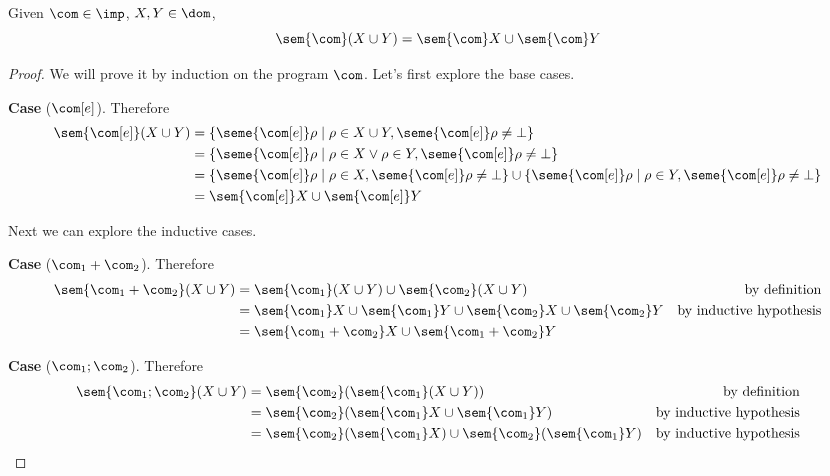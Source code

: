 \begin{observation}[Additivity]
  Given \(\com\in\imp\), \(X,Y \in \dom\),
  \[\sem{\com}(X\cup Y) = \sem{\com}X \cup \sem{\com}Y\]
\end{observation}

\begin{proof}
  We will prove it by induction on the program \(\com\). Let's first
  explore the base cases.

  \medskip

  \noindent
  \textbf{Case} (\(\com[e]\)). Therefore
  \begin{align*}
    \sem{\com[e]}(X\cup Y) & = \{\seme{\com[e]}\rho \mid \rho \in X \cup Y, \seme{\com[e]}\rho \neq \bot\} \\
                           & = \{\seme{\com[e]}\rho \mid \rho \in X \vee \rho \in Y, \seme{\com[e]}\rho \neq \bot\} \\
                           & = \{\seme{\com[e]}\rho \mid \rho \in X , \seme{\com[e]}\rho \neq \bot\} \cup \{\seme{\com[e]}\rho \mid \rho \in Y , \seme{\com[e]}\rho \neq \bot\} \\
                           & = \sem{\com[e]}X \cup \sem{\com[e]}Y
  \end{align*}
  
  \medskip

  \noindent
  Next we can explore the inductive cases.

  \medskip
  
  \noindent
  \textbf{Case} (\(\com_1 + \com_2\)). Therefore
  \begin{align*}
    \sem{\com_1 + \com_2}(X\cup Y) & = \sem{\com_1}(X \cup Y) \cup \sem{\com_2}(X \cup Y) & \text{by definition}\\
                                   & = \sem{\com_1}X \cup \sem{\com_1}Y \cup \sem{\com_2}X \cup \sem{\com_2}Y & \text{by inductive hypothesis} \\
                                   & = \sem{\com_1 + \com_2} X \cup \sem{\com_1 + \com_2} Y
  \end{align*}

  \medskip

  \noindent
  \textbf{Case} (\(\com_1; \com_2\)). Therefore
  \begin{align*}
    \sem{\com_1 ; \com_2}(X\cup Y) & = \sem{\com_2}(\sem{\com_1}(X \cup Y)) & \text{by definition}\\
                                   & = \sem{\com_2}(\sem{\com_1}X \cup \sem{\com_1}Y) & \text{by inductive hypothesis}\\
                                   & = \sem{\com_2}(\sem{\com_1}X) \cup \sem{\com_2}(\sem{\com_1}Y) & \text{by inductive hypothesis}
  \end{align*}
  

\end{proof}
